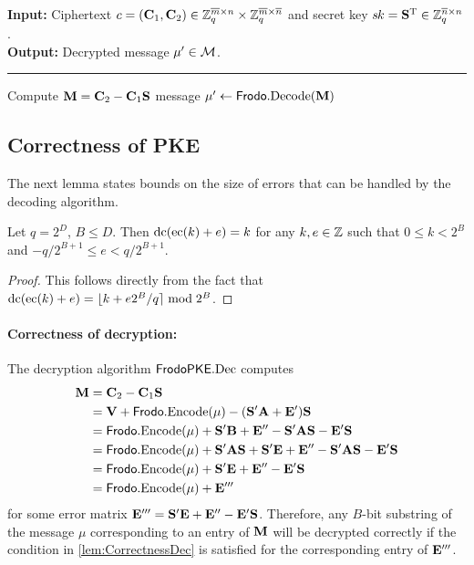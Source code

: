 \documentclass{iacrcc}
\begin{document}
\begin{algorithm}[H]
\caption{\label{alg:PKE:Dec} $\FrodoPKE.\Dec$.}
{\bf Input:} Ciphertext $c=(\mathbf{C}_1, \mathbf{C}_2)  \in \mathbb{Z}_q^{\overline{m}\times n}\times \mathbb{Z}_q^{\overline{m}\times\overline{n}}$ and secret key $s\mkern-1muk = \mathbf{S}^\text{T} \in \mathbb{Z}_q^{\overline{n} \times n}$.\\
{\bf Output:} Decrypted message $\mu' \in \mathcal{M}$.\\[-1.5ex]
\rule{\linewidth}{.5pt}
\vspace{-0.5cm}
\begin{algorithmic}[1]
    \STATE Compute $\mathbf{M} = \mathbf{C}_2 - \mathbf{C}_1\mathbf{S}$
    \RETURN message $\mu' \gets \textsf{\upshape\mdseries Frodo}.\textrm{\upshape\mdseries Decode}(\mathbf{M})$
    \end{algorithmic}
\end{algorithm}    

\subsection{Correctness of \INDCPA PKE}\label{sec:cpa-pke-correctness}

The next lemma states bounds on the size of errors that can be handled
by the decoding algorithm.

\begin{lemma}\label{lem:CorrectnessDec}
  Let $q = 2^D$, $B \leq D$. Then $\textrm{\upshape\mdseries dc}(\textrm{\upshape\mdseries ec}(k)+e) = k$ for any
  $k,e\in \mathbb{Z}$ such that $0\leq k <2^B$ and
  $-q/2^{B+1} \leq e < q/2^{B+1}$.
\end{lemma}

\begin{proof}
  This follows directly from the fact that
  $\textrm{\upshape\mdseries dc}(\textrm{\upshape\mdseries ec}(k)+e) = \lfloor k + e2^B/q \rceil \bmod 2^B$.
\end{proof}

\paragraph{Correctness of decryption:}
The decryption algorithm $\FrodoPKE.\Dec$ computes 
\begin{align*}
\mathbf{M} 
&= \mathbf{C}_2 - \mathbf{C}_1\mathbf{S} \\
&= \mathbf{V} + \textsf{\upshape\mdseries Frodo}.\textrm{\upshape\mdseries Encode}(\mu) - (\mathbf{S}'\mathbf{A} + \mathbf{E}')\mathbf{S} \\
&= \textsf{\upshape\mdseries Frodo}.\textrm{\upshape\mdseries Encode}(\mu) + \mathbf{S}'\mathbf{B} + \mathbf{E}'' - \mathbf{S}'\mathbf{A}\mathbf{S} - \mathbf{E}'\mathbf{S} \\
&= \textsf{\upshape\mdseries Frodo}.\textrm{\upshape\mdseries Encode}(\mu) + \mathbf{S}'\mathbf{A}\mathbf{S} + \mathbf{S}'\mathbf{E} +  \mathbf{E}'' - \mathbf{S}'\mathbf{A}\mathbf{S} - \mathbf{E}'\mathbf{S} \\
&= \textsf{\upshape\mdseries Frodo}.\textrm{\upshape\mdseries Encode}(\mu) + \mathbf{S}'\mathbf{E} + \mathbf{E}''- \mathbf{E}'\mathbf{S} \\
&= \textsf{\upshape\mdseries Frodo}.\textrm{\upshape\mdseries Encode}(\mu) + \mathbf{E}'''
\end{align*}
for some error matrix $\mathbf{E}''' = \mathbf{S}' \mathbf{E} + \mathbf{E}'' - \mathbf{E}'
\mathbf{S}$. Therefore, any $B$-bit substring of the message $\mu$
corresponding to an entry of $\mathbf{M}$ will be decrypted correctly if the
condition in \autoref{lem:CorrectnessDec} is satisfied for the
corresponding entry of $\mathbf{E}'''$.
\end{document}
